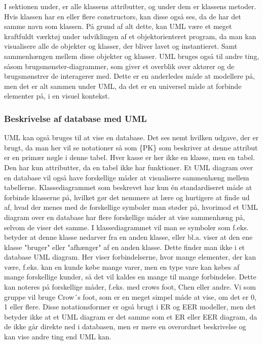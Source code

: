 I sektionen under, er alle klassens attributter, og under dem er klassens metoder. Hvis klassen har en eller flere constructors, kan disse også ses, da de har det samme navn som klassen. På grund af alt dette, kan UML være et meget kraftfuldt værktøj under udviklingen af et objektorienteret program, da man kan visualisere alle de objekter og klasser, der bliver lavet og instantieret. Samt sammenhængen mellem disse objekter og klasser. UML bruges også til andre ting, såsom brugsmønster-diagrammer, som giver et overblik over aktører og de brugsmønstrer de interagerer med. Dette er en anderledes måde at modellere på, men det er alt sammen under UML, da det er en universel måde at forbinde elementer på, i en visuel kontekst.


\subsubsection{Beskrivelse af database med UML}
UML kan også bruges til at vise en database. Det ses nemt hvilken udgave, der er brugt, da man her vil se notationer så som \{PK\} som beskriver at denne attribut er en primær nøgle i denne tabel. Hver kasse er her ikke en klasse, men en tabel. Den har kun attributter, da en tabel ikke har funktioner. Et UML diagram over en database vil også have forskellige måder at visualisere sammenhæng mellem tabellerne.
Klassediagrammet som beskrevet har kun én standardiseret måde at forbinde klasserne på, hvilket gør det nemmere at lære og hurtigere at finde ud af, hvad der menes med de forskellige symboler man støder på, hvorimod et UML diagram over en database har flere forskellige måder at vise sammenhæng på, selvom de viser det samme. I klassediagrammet vil man se symboler som f.eks. betyder at denne klasse nedarver fra en anden klasse, eller bl.a. viser at den ene klasse "bruger" eller "afhænger" af en anden klasse. Dette finder man ikke i et database UML diagram. Her viser forbindelserne, hvor mange elementer, der kan være, f.eks. kan en kunde købe mange varer, men en type vare kan købes af mange forskellige kunder, så det vil kaldes en mange til mange forbindelse. Dette kan noteres på forskellige måder, f.eks. med crows foot, Chen eller andre. Vi som gruppe vil bruge Crow´s foot, som er en meget simpel måde at vise, om det er 0, 1 eller flere. Disse notationsformer er også brugt i ER og EER modeller, men det betyder ikke at et UML diagram er det samme som et ER eller EER diagram, da de ikke går direkte ned i databasen, men er mere en overordnet beskrivelse og kan vise andre ting end UML kan.


